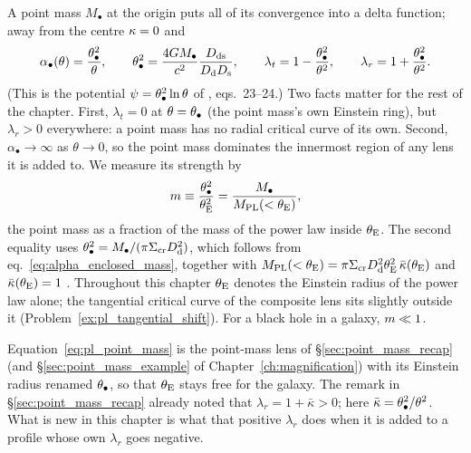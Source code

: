 A point mass $M_\bullet$ at the origin puts all of its convergence into
a delta function; away from the centre $\kappa=0$ and
\begin{equation}
    \alpha_\bullet(\theta)=\frac{\theta_{\bullet}^2}{\theta} ,
    \qquad
    \theta_{\bullet}^2=\frac{4G M_\bullet}{c^2}\frac{D_{\mathrm{ds}}}{D_{\mathrm{d}}D_{\mathrm{s}}} ,
    \qquad
    \lambda_t=1-\frac{\theta_{\bullet}^2}{\theta^2} ,
    \qquad
    \lambda_r=1+\frac{\theta_{\bullet}^2}{\theta^2} .
    \label{eq:pl_point_mass}
\end{equation}
(This is the potential $\psi=\theta_{\bullet}^2\ln\theta$ of
\citet{keeton_2001_catalog}, eqs.~23--24.)  Two facts matter for the
rest of the chapter.  First, $\lambda_t=0$ at $\theta=\theta_{\bullet}$ (the
point mass's own Einstein ring), but $\lambda_r>0$ everywhere: a point
mass has no radial critical curve of its own.  Second,
$\alpha_\bullet\to\infty$ as $\theta\to0$, so the point mass
dominates the innermost region of any lens it is added to.
We measure its strength by
\begin{equation}
    m \equiv \frac{\theta_{\bullet}^2}{\theta_{\mathrm{E}}^2} = \frac{M_\bullet}{M_{\rm PL}(<\theta_{\mathrm{E}})} ,
    \label{eq:pl_mass_fraction}
\end{equation}
the point mass as a fraction of the mass of the power law inside
$\theta_{\mathrm{E}}$.  The second equality uses
$\theta_{\bullet}^2=M_\bullet/(\pi\Sigma_{\mathrm{cr}}D_{\mathrm{d}}^2)$, which follows from
eq.~\eqref{eq:alpha_enclosed_mass}, together with
$M_{\rm PL}(<\theta_{\mathrm{E}})=\pi\Sigma_{\mathrm{cr}}D_{\mathrm{d}}^2\theta_{\mathrm{E}}^2\,\bar\kappa(\theta_{\mathrm{E}})$
and $\bar\kappa(\theta_{\mathrm{E}})=1$ .  Throughout this chapter
$\theta_{\mathrm{E}}$ denotes the Einstein radius of the power law alone;
the tangential critical curve of the composite lens sits slightly
outside it (Problem~\ref{ex:pl_tangential_shift}).  For a black hole
in a galaxy, $m\ll1$.

\begin{bridge}
Equation~\eqref{eq:pl_point_mass} is the point-mass lens of
\S\ref{sec:point_mass_recap} (and \S\ref{sec:point_mass_example} of
Chapter~\ref{ch:magnification}) with its Einstein radius renamed
$\theta_{\bullet}$, so that $\theta_{\mathrm{E}}$ stays free for the galaxy.  The remark in
\S\ref{sec:point_mass_recap} already noted that
$\lambda_r=1+\bar\kappa>0$; here $\bar\kappa=\theta_{\bullet}^2/\theta^2$.  What
is new in this chapter is what that positive $\lambda_r$ does when it
is added to a profile whose own $\lambda_r$ goes negative.
\end{bridge}



